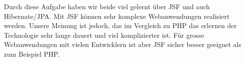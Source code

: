 \documentclass[a4paper, abstracton]{scrartcl}
\begin{document}
Durch diese Aufgabe haben wir beide viel gelernt über JSF und auch Hibernate/JPA. Mit JSF können sehr komplexe Webanwendungen realisiert werden. Unsere Meinung ist jedoch, das im Vergleich zu PHP das erlernen der Technologie sehr lange dauert und viel komplizierter ist. Für grosse Webanwendungen mit vielen Entwicklern ist aber JSF sicher besser geeignet als zum Beispiel PHP.


\pagebreak
\listoffigures		%

\pagebreak	%


\pagebreak


\pagebreak	
\end{document}
